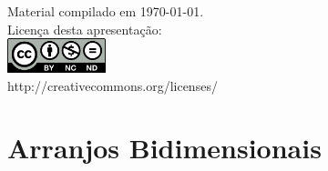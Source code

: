 \documentclass[portuguese,10pt,xcolor=table]{bredelebeamer}
\title{\insertlecture}
\author{Prof. Fernando Figueira\\(adaptado do material do Prof. Rafael Beserra Gomes)}
\institute{UFRN}
\date{}
\begin{document}
\begin{frame}
  \maketitle
 \begin{center}
 \tiny
Material compilado em \today.\\
  Licença desta apresentação:\\
		\includegraphics[height=1.0cm]{by-nc-nd.png}\\
http://creativecommons.org/licenses/
	\end{center}
\end{frame}


	\def\GN[#1]{\colorbox{gray!40}{#1}}
	\def\RN[#1]{\cellcolor{red!40}#1}
	\def\BN[#1]{\colorbox{blue!40}{#1}}
	\def\ON[#1]{\colorbox{orange!40}{#1}}
	\def\WN[#1]{\colorbox{white!40}{#1}}


\section{Arranjos Bidimensionais}

	\begin{frame}[c]
		\begin{center}
			\structure{\large \insertsection}
		\end{center}
	\end{frame} 
	
\end{document}
